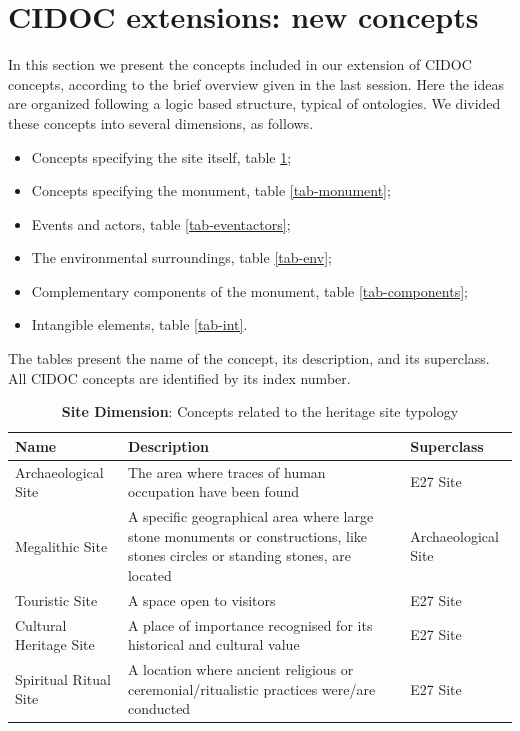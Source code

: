 \documentclass[10pt]{report}
\begin{document}
\section{CIDOC extensions: new concepts}\label{sec-newconcepts}

In this section we present the concepts included in our extension of CIDOC concepts, according to the brief overview given in the last session. Here the ideas are organized following a logic based structure, typical of ontologies. We divided these concepts into several dimensions, as follows.



\begin{itemize}
    \item Concepts specifying the site itself, table \ref{tab-site};
    \item Concepts specifying the monument, table \ref{tab-monument};

    \item Events and actors, table \ref{tab-eventactors};
    \item The environmental surroundings, table \ref{tab-env};

    \item Complementary components of the monument, table \ref{tab-components};
         
    \item Intangible elements, table \ref{tab-int}.
\end{itemize}

The tables present the name of the concept, its description, and its superclass. All CIDOC concepts are identified by its index number.

\begin{longtable}{|p{1in}|p{2.5in}|p{2.5in}|}
    \caption{\textbf{Site Dimension}: Concepts related to the heritage site typology}
    \label{tab-site} \\
    \hline
    Name & Description & Superclass \\
    \hline \hline 
    Archaeological Site & The area where traces of human occupation have been found & E27 Site \\
    \hline 
    Megalithic Site & A specific geographical area where large stone monuments or constructions, like stones circles or standing stones, are located & Archaeological Site \\
    \hline 
    Touristic Site & A space open to visitors & E27 Site \\
    \hline 
    Cultural Heritage Site & A place of importance recognised for its historical and cultural value & E27 Site \\
    \hline 
    Spiritual Ritual Site & A location where ancient religious or ceremonial/ritualistic practices were/are conducted & E27 Site \\
    \hline
\end{longtable}
\end{document}
